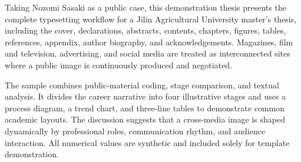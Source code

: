 
Taking Nozomi Sasaki as a public case, this demonstration thesis presents the complete typesetting workflow for a Jilin Agricultural University master's thesis, including the cover, declarations, abstracts, contents, chapters, figures, tables, references, appendix, author biography, and acknowledgements. Magazines, film and television, advertising, and social media are treated as interconnected sites where a public image is continuously produced and negotiated.

The sample combines public-material coding, stage comparison, and textual analysis. It divides the career narrative into four illustrative stages and uses a process diagram, a trend chart, and three-line tables to demonstrate common academic layouts. The discussion suggests that a cross-media image is shaped dynamically by professional roles, communication rhythm, and audience interaction. All numerical values are synthetic and included solely for template demonstration.

\jlauKeywordsEnLine
